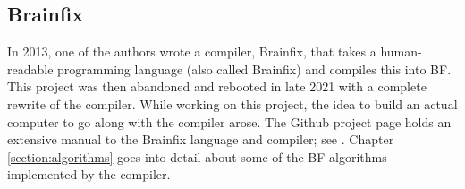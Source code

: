 \subsection{Brainfix}
In 2013, one of the authors wrote a compiler, Brainfix, that takes a human-readable programming language (also called Brainfix) and compiles this into BF. This project was then abandoned and rebooted in late 2021 with a complete rewrite of the compiler. While working on this project, the idea to build an actual computer to go along with the compiler arose. The Github project page holds an extensive manual to the Brainfix language and compiler; see \cite{brainfix}. Chapter \ref{section:algorithms} goes into detail about some of the BF algorithms implemented by the compiler.
